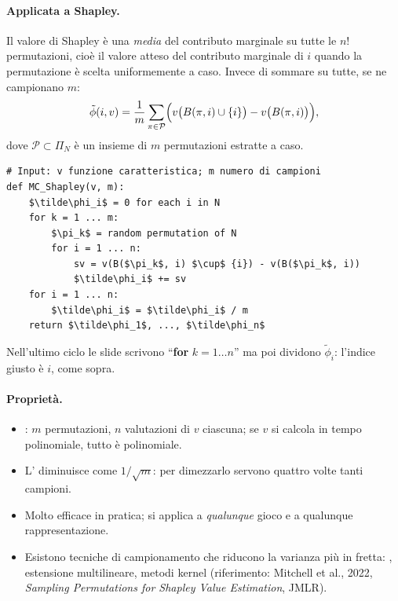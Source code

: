 \paragraph{Applicata a Shapley.}
Il valore di Shapley è una \emph{media} del contributo marginale su tutte le $n!$
permutazioni, cioè il valore atteso del contributo marginale di $i$ quando la permutazione
è scelta uniformemente a caso. Invece di sommare su tutte, se ne campionano $m$:
\[
  \tilde\phi(i, v) = \frac1m \sum_{\pi \in \mathcal{P}}
     \Bigl( v\bigl(B(\pi, i) \cup \{i\}\bigr) - v\bigl(B(\pi, i)\bigr) \Bigr),
\]
dove $\mathcal{P} \subset \Pi_N$ è un insieme di $m$ permutazioni estratte a caso.

\begin{lstlisting}[style=pseudo]
# Input: v funzione caratteristica; m numero di campioni
def MC_Shapley(v, m):
    $\tilde\phi_i$ = 0 for each i in N
    for k = 1 ... m:
        $\pi_k$ = random permutation of N
        for i = 1 ... n:
            sv = v(B($\pi_k$, i) $\cup$ {i}) - v(B($\pi_k$, i))
            $\tilde\phi_i$ += sv
    for i = 1 ... n:
        $\tilde\phi_i$ = $\tilde\phi_i$ / m
    return $\tilde\phi_1$, ..., $\tilde\phi_n$
\end{lstlisting}

\begin{attenzione}
Nell'ultimo ciclo le slide scrivono ``\textbf{for} $k = 1 \dots n$'' ma poi dividono
$\tilde\phi_i$: l'indice giusto è $i$, come sopra.
\end{attenzione}

\paragraph{Proprietà.}
\begin{itemize}
  \item {}: $m$ permutazioni, $n$ valutazioni di $v$ ciascuna; se $v$
        si calcola in tempo polinomiale, tutto è polinomiale.
  \item L' diminuisce come $1/\sqrt{m}$: per dimezzarlo servono quattro volte
        tanti campioni.
  \item Molto efficace in pratica; si applica a \emph{qualunque} gioco e a qualunque
        rappresentazione.
  \item Esistono tecniche di campionamento che riducono la varianza più in fretta:
        , estensione multilineare, metodi kernel (riferimento:
        Mitchell et al., 2022, \emph{Sampling Permutations for Shapley Value Estimation},
        JMLR).
\end{itemize}

